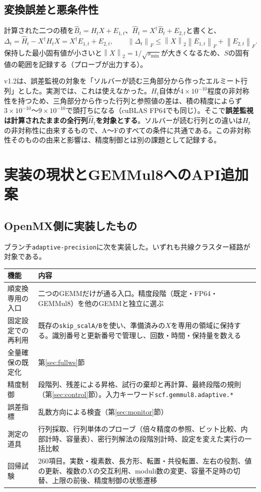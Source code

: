 \documentclass[a4paper,11pt]{ltjsarticle}
\newcommand{\code}[1]{\texttt{#1}}
\newcommand{\norm}[1]{\left\lVert#1\right\rVert}
\newcommand{\E}[1]{\times10^{#1}}
\begin{document}
\subsection{変換誤差と悪条件性}\label{sec:errorprop}
計算された二つの積を$\widehat B_t=H_tX+E_{1,t}$、$\widehat H_t=X^\dagger\widehat B_t+E_{2,t}$と書くと、
\begin{equation}
 \Delta_t=\widehat H_t-X^\dagger H_tX
 =X^\dagger E_{1,t}+E_{2,t},\qquad
 \norm{\Delta_t}_F\le\norm{X}_2\norm{E_{1,t}}_F+\norm{E_{2,t}}_F .
 \label{eq:error}
\end{equation}
保持した最小固有値が小さいと$\norm{X}_2=1/\sqrt{s_{\min}}$が大きくなるため、$S$の固有値の範囲を記録する（プローブが出力する）。

v1.2は、誤差監視の対象を「ソルバーが読む三角部分から作ったエルミート行列」とした。実測では、これは使えなかった。$H_t$自体が$4\E{-10}$程度の非対称性を持つため、三角部分から作った行列と参照値の差は、積の精度によらず$3\E{-10}$〜$9\E{-10}$で頭打ちになる（cuBLAS FP64でも同じ）。そこで\textbf{誤差監視は計算されたままの全行列$\widehat H_t$を対象とする}。ソルバーが読む行列との違いは$H_t$の非対称性に由来するもので、A〜Fのすべての条件に共通である。この非対称性そのものの由来と影響は、精度制御とは別の課題として記録する。

\section{実装の現状とGEMMul8へのAPI追加案}
\subsection{OpenMX側に実装したもの}
ブランチ\code{adaptive-precision}に次を実装した。いずれも共線クラスター経路が対象である。

\noindent\begin{tabularx}{\linewidth}{@{}p{37mm}Y@{}}
\toprule
機能 & 内容\\
\midrule
順変換専用の入口 & 二つのGEMMだけが通る入口。精度段階（既定・FP64・GEMMul8）を他のGEMMと独立に選ぶ\\
固定設定での再利用 & 既存の\code{skip\_scalA/B}を使い、準備済みの$X$を専用の領域に保持する。識別番号と更新番号で管理し、回数・時間・保持量を数える\\
全量確保の既定化 & 第\ref{sec:fullws}節\\
精度制御 & 段階列、残差による昇格、試行の棄却と再計算、最終段階の規則（第\ref{sec:control}節）。入力キーワード\code{scf.gemmul8.adaptive.*}\\
誤差指標 & 乱数方向による検査（第\ref{sec:monitor}節）\\
測定の道具 & 行列採取、行列単体のプローブ（倍々精度の参照、ビット比較、内部計時、容量表）、密行列解法の段階別計時、設定を変えた実行の一括比較\\
回帰試験 & 260項目。実数・複素数、長方形、転置・共役転置、左右の役割、値の更新、複数の$X$の交互利用、moduli数の変更、容量不足時の切替、上限の前後、精度制御の状態遷移\\
\bottomrule
\end{tabularx}
\end{document}
